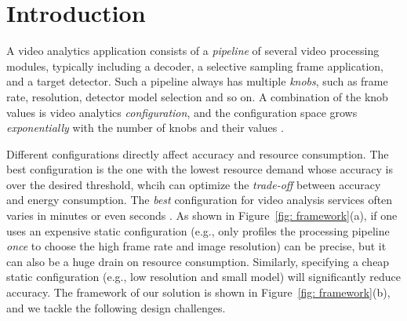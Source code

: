 \section{Introduction}

\label{Section: introduction}
A video analytics application consists of a \emph{pipeline} of several video processing modules, typically including a decoder, a selective sampling frame application, and a target detector. Such a pipeline always has multiple \emph{knobs}, such as frame rate, resolution,  detector model selection and so on. A combination of the knob values is video analytics \emph{configuration}, and the configuration space grows \emph{exponentially} with the number of knobs and their values \cite{jiang2018chameleon}.

Different configurations directly affect accuracy and resource consumption. The best configuration is the one with the lowest resource demand whose accuracy is over the desired threshold, whcih can optimize the \emph{trade-off} between accuracy and energy consumption. The \emph{best} configuration for video analysis services often varies in minutes or even seconds \cite{jiang2018chameleon}. As shown in Figure~\ref{fig: framework}(a), if one uses an expensive static configuration (e.g., only profiles the processing pipeline \emph{once} to choose the high frame rate and image resolution) can be precise, but it can also be a huge drain on resource consumption. Similarly, specifying a cheap static configuration (e.g., low resolution and small model) will significantly reduce accuracy. The framework of our solution %
is shown in Figure~\ref{fig: framework}(b), and we tackle the following design challenges.

